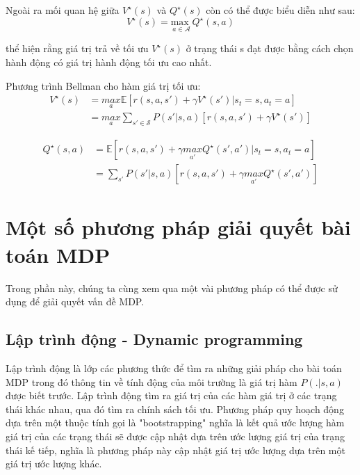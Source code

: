 \documentclass{uetgraduation}
\begin{document}
Ngoài ra mối quan hệ giữa $V^\star (s)$ và $Q^\star (s)$ còn có thể được biểu diễn như sau:
\begin{equation}
    V^\star (s) = \underset{a \in \mathcal{A}}{\text{max }} Q^\star (s, a)
\end{equation}

thể hiện rằng giá trị trả về tối ưu $V^\star (s)$ ở trạng thái s đạt được bằng cách chọn hành động có giá trị hành động tối ưu cao nhất.

Phương trình Bellman cho hàm giá trị tối ưu:
\begin{equation}
    \begin{split}
        V^\star (s) &= \underset{a}{max } \mathbb{E} [r(s, a, s') + \gamma V^\star (s') | s_t = s, a_t = a] \\
        &= \underset{a}{max } \sum_{s' \in \mathcal{S}} P(s' | s, a) [r(s, a, s') + \gamma V^\star (s')]
    \end{split}
\end{equation}

\begin{equation}
    \begin{split}
        Q^\star (s, a) &= \mathbb{E} [r(s, a, s') + \gamma \underset{a'}{ max } Q^\star (s', a') | s_t = s, a_t = a] \\
        &= \sum_{s'} P(s' | s, a) [r(s, a, s') + \gamma \underset{a'}{max } Q^\star (s', a')]
    \end{split}
\end{equation}

\section{Một số phương pháp giải quyết bài toán MDP}
Trong phần này, chúng ta cùng xem qua một vài phương pháp có thể được sử dụng để giải quyết vấn đề MDP.

\subsection{Lập trình động - Dynamic programming}

Lập trình động là lớp các phương thức để tìm ra những giải pháp cho bài toán MDP trong đó thông tin về tính động của môi trường là giá trị hàm $P(.|s, a)$ được biết trước. Lập trình động tìm ra
giá trị của các hàm giá trị ở các trạng thái khác nhau, qua đó tìm ra chính sách tối ưu. Phương pháp quy hoạch động dựa trên một thuộc tính gọi là "bootstrapping" nghĩa là kết quả ước lượng hàm giá trị của
các trạng thái sẽ được cập nhật dựa trên ước lượng giá trị của trạng thái kế tiếp, nghĩa là phương pháp này cập nhật giá trị ước lượng dựa trên một giá trị ước lượng khác.
\end{document}
